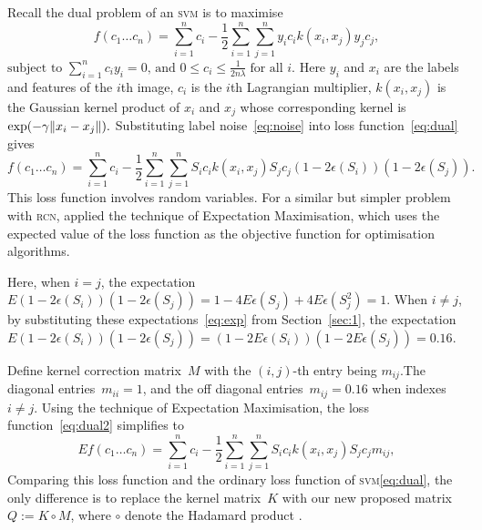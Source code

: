 \documentclass[12pt]{article} %
\DeclarePairedDelimiter{\norm}{\lVert}{\rVert}
\newcommand{\svm}{\textsc{svm}}
\begin{document}
Recall the dual problem of an \textsc{svm} is to maximise
\begin{equation}
   f(c_{1}\ldots c_{n})=\sum _{i=1}^{n}c_{i}-{\frac {1}{2}}\sum _{i=1}^{n}\sum _{j=1}^{n}y_{i}c_{i}k(x_{i},x_{j})y_{j}c_{j}, \label{eq:dual}
\end{equation}
\begin{math}
{\text{subject to }}\sum _{i=1}^{n}c_{i}y_{i}=0,\,{\text{and }}0\leq c_{i}\leq {\frac {1}{2n\lambda }}\;{\text{for all }}i. 
\end{math} 
Here $y_i$ and $x_i$ are the labels and features of the $i$th image, $c_i$ is the $i$th Lagrangian multiplier, $k(x_i,x_j)$ is the Gaussian kernel product of $x_i$ and $x_j$ whose corresponding kernel is
\begin{math}
\exp(-\gamma\norm{x_i-x_j}).
\end{math} 
Substituting label noise~\eqref{eq:noise} into loss function~\eqref{eq:dual} gives
\begin{equation}
   f(c_{1}\ldots c_{n})=\sum _{i=1}^{n}c_{i}-{\frac {1}{2}}\sum _{i=1}^{n}\sum _{j=1}^{n}S_{i}c_{i}k(x_{i},x_{j})S_{j}c_{j}(1-2\epsilon(S_i))(1-2\epsilon(S_j)). \label{eq:dual2}
\end{equation}
This loss function involves random variables. For a similar  but simpler problem with \textsc{rcn}, \citet{pmlr-v20-biggio11} applied the technique of Expectation Maximisation, which uses the expected value of the loss function as the objective function for optimisation algorithms.

Here, when $i=j$, the expectation~$E(1-2\epsilon(S_i))(1-2\epsilon(S_j))=1-4E\epsilon(S_j)+4E\epsilon(S_j^2)=1$. 
When $i\neq j$, by substituting these expectations~\eqref{eq:exp} from Section~\ref{sec:1}, the expectation~$E(1-2\epsilon(S_i))(1-2\epsilon(S_j))=(1-2E\epsilon(S_i))(1-2E\epsilon(S_j))=0.16$. 

Define kernel correction matrix~$M$ with the $(i,j)$-th entry being $m_{ij}$.The diagonal entries~$m_{ii}=1 $, and the off diagonal entries~$m_{ij}=0.16$ when indexes~$i\neq j$. Using the technique of Expectation Maximisation, the loss function~\eqref{eq:dual2} simplifies to
\begin{equation}
   Ef(c_{1}\ldots c_{n})=\sum _{i=1}^{n}c_{i}-{\frac {1}{2}}\sum _{i=1}^{n}\sum _{j=1}^{n}S_{i}c_{i}k(x_{i},x_{j})S_{j}c_{j}m_{ij}, \label{eq:dual3}
\end{equation}
Comparing this loss function and the ordinary loss function of \svm \eqref{eq:dual}, the only difference is to replace the kernel matrix~$K$ with our new proposed matrix~$Q:=K\circ M$, where $\circ$ denote the Hadamard product \citep{hastie01statisticallearning}.
\end{document}
